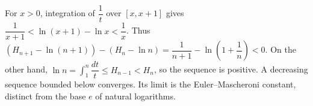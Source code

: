 For $x>0$, integration of $\dfrac{1}{t}$ over $[x,x+1]$ gives $\dfrac{1}{x+1}<\ln(x+1)-\ln x<\dfrac{1}{x}$. Thus $(H_{n+1}-\ln(n+1))-(H_n-\ln n)=\dfrac{1}{n+1}-\ln(1+\dfrac{1}{n})<0$. On the other hand, $\ln n=\int_1^n\dfrac{dt}{t}\le H_{n-1}<H_n$, so the sequence is positive. A decreasing sequence bounded below converges. Its limit is the Euler--Mascheroni constant, distinct from the base $e$ of natural logarithms.
